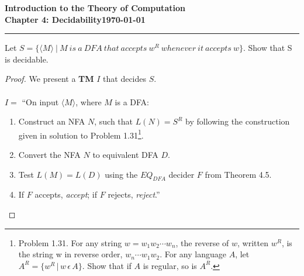 \documentclass[11pt]{article}
\newcommand{\dated}{\today}
\begin{document}
\textbf{Introduction to the Theory of
Computation}\hfill\textbf{\myname}\\[0.01in]
\textbf{Chapter 4: Decidability}\hfill\textbf{\dated}\\
\smallskip\hrule\bigskip

\begin{problem}{4.21}
Let $S = \{\langle M \rangle \ | \ M \ is \ a \ DFA \ that \ accepts \ w^R \ whenever \ it \ accepts \ w \}$. Show that S is decidable.
\end{problem}

\begin{proof}
We present a \textbf{TM} $I$ that decides $S$.  \\
\\
$I =$ \textquotedblleft On input $\langle M \rangle$, where $M$ is a DFA:
\begin{enumerate}
\item Construct an NFA $N$, such that $L(N) = S^{R}$ by following the construction given in solution to Problem 1.31\footnote{Problem 1.31. For any string $w = w_{1} w_{2} \cdots w_{n}$, the reverse of $w$, written $w^{R}$, is the string {w} in reverse order, $w_{n} \cdots w_{1} w_{2}$. For any language $A$, let $A^{R} = \lbrace w^{R} \, | \, w \, \epsilon \, A \rbrace$. Show that if $A$ is regular, so is $A^{R}$.}.
\item Convert the NFA $N$ to equivalent DFA $D$.
\item Test $L(M) = L(D)$ using the $EQ_{DFA}$ decider $F$ from Theorem 4.5.
\item If $F$ accepts, \textit{accept}; if $F$ rejects, \textit{reject}.\textquotedblright
\end{enumerate}
\end{proof}
\end{document}
